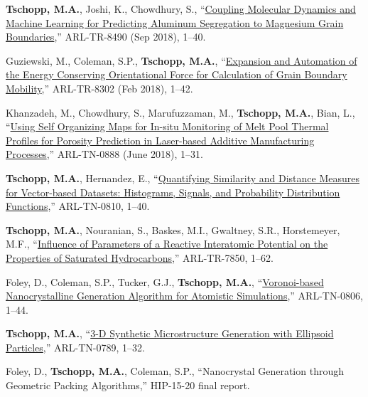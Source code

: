 \begin{cvlist}
\item
\textbf{Tschopp, M.A.}, {Joshi, K.}, Chowdhury, S., ``\href{https://apps.dtic.mil/dtic/tr/fulltext/u2/1059513.pdf}{Coupling Molecular Dynamics and Machine Learning for Predicting Aluminum Segregation to Magnesium Grain Boundaries},'' ARL-TR-8490 (Sep 2018), 1--40.

\item
Guziewski, M., Coleman, S.P., \textbf{Tschopp, M.A.}, ``\href{https://apps.dtic.mil/sti/pdfs/AD1047833.pdf}{Expansion and Automation of the Energy Conserving Orientational Force for Calculation of Grain Boundary Mobility},'' ARL-TR-8302 (Feb 2018), 1--42.

\item
{Khanzadeh, M.}, Chowdhury, S., Marufuzzaman, M., \textbf{Tschopp, M.A.}, Bian, L., ``\href{https://apps.dtic.mil/dtic/tr/fulltext/u2/1078016.pdf}{Using Self Organizing Maps for In-situ Monitoring of Melt Pool Thermal Profiles for Porosity Prediction in Laser-based Additive Manufacturing Processes},'' ARL-TN-0888 (June 2018), 1--31.

\item
\textbf{Tschopp, M.A.}, Hernandez, E.,  ``\href{https://apps.dtic.mil/sti/pdfs/AD1026967.pdf}{Quantifying Similarity and Distance Measures for Vector-based Datasets: Histograms, Signals, and Probability Distribution Functions},'' ARL-TN-0810, 1--40.

\item
\textbf{Tschopp, M.A.}, Nouranian, S., Baskes, M.I., Gwaltney, S.R., Horstemeyer, M.F., ``\href{https://apps.dtic.mil/sti/pdfs/AD1026964.pdf}{Influence of Parameters of a Reactive Interatomic Potential on the Properties of Saturated Hydrocarbons},'' ARL-TR-7850, 1--62.

\item
{Foley, D.}, Coleman, S.P.,  Tucker, G.J., \textbf{Tschopp, M.A.}, ``\href{https://apps.dtic.mil/sti/pdfs/AD1023687.pdf}{Voronoi-based Nanocrystalline Generation Algorithm for Atomistic Simulations},'' ARL-TN-0806, 1--44.

\item
\textbf{Tschopp, M.A.}, ``\href{https://apps.dtic.mil/sti/pdfs/AD1017883.pdf}{3-D Synthetic Microstructure Generation with Ellipsoid Particles},'' ARL-TN-0789, 1--32.

\item
{Foley, D.}, \textbf{Tschopp, M.A.}, Coleman, S.P., ``Nanocrystal Generation through Geometric Packing Algorithms,'' HIP-15-20 final report.


\end{cvlist}

